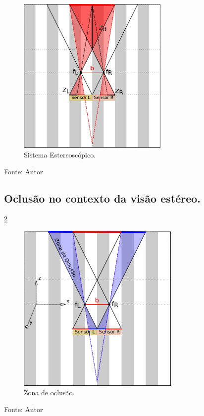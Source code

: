 \begin{figure}[!htb]
  \centering
  \caption{Sistema Estereoscópico.}
  \label{fig:stereo_vision_main_example}
  \includegraphics[width=0.65\textwidth]{./img/fundamentacao/stereo_vision_main_example.png}
\end{figure}
Fonte: Autor

\pagebreak

\subsection{Oclusão no contexto da visão estéreo.}

\ref{fig:stereo_vision_occlusion}
\begin{figure}[!htb]
  \centering
  \caption{Zona de oclusão.}
  \label{fig:stereo_vision_occlusion}
  \includegraphics[width=0.7\textwidth]{./img/fundamentacao/stereo_vision_occlusion.png}
\end{figure}
Fonte: Autor

